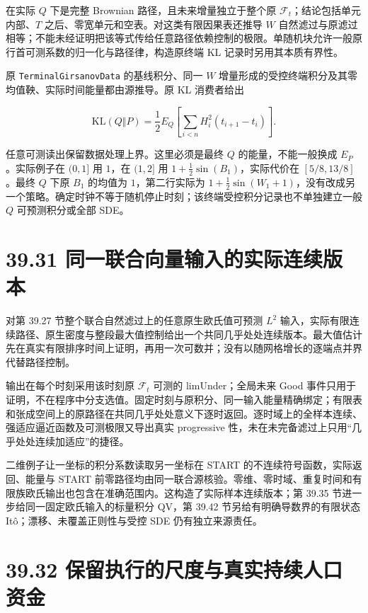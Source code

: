 \documentclass[
  11pt,
  oneside]{book}
\begin{document}
在实际 \(Q\) 下是完整 Brownian 路径，且未来增量独立于整个原 \(\mathcal F_t\)；结论包括单元内部、\(T\) 之后、零宽单元和空表。对这类有限因果表还推导 \(W\) 自然滤过与原滤过相等；不能未经证明把该等式传给任意路径依赖控制的极限。单随机块允许一般原行首可测系数的归一化与路径律，构造原终端 KL 记录时另用其本质有界性。

原 \nolinkurl{TerminalGirsanovData} 的基线积分、同一 \(W\) 增量形成的受控终端积分及其零均值鞅、实际时间能量都由源推导。原 KL 消费者给出

\[\mathrm{KL}(Q\Vert P)=\frac12 E_Q\!\left[\sum_{i<n}H_i^2(t_{i+1}-t_i)\right].\]

任意可测读出保留数据处理上界。这里必须是最终 \(Q\) 的能量，不能一般换成 \(E_P\)。实际例子在 \((0,1]\) 用 \(1\)，在 \((1,2]\) 用 \(1+\tfrac12\sin(B_1)\)，实际代价在 \([5/8,13/8]\)。最终 \(Q\) 下原 \(B_1\) 的均值为 \(1\)，第二行实际为 \(1+\tfrac12\sin(W_1+1)\)，没有改成另一个策略。确定时钟不等于随机停止时刻；该终端受控积分记录也不单独建立一般 \(Q\) 可预测积分或全部 SDE。

\section{39.31 同一联合向量输入的实际连续版本}\label{ux540cux4e00ux8054ux5408ux5411ux91cfux8f93ux5165ux7684ux5b9eux9645ux8fdeux7eedux7248ux672c}

对第 39.27 节整个联合自然滤过上的任意原生欧氏值可预测 \(L^2\) 输入，实际有限连续路径、原生密度与整段最大值控制给出一个共同几乎处处连续版本。最大值估计先在真实有限排序时间上证明，再用一次可数并；没有以随网格增长的逐端点并界代替路径控制。

输出在每个时刻采用该时刻原 \(\mathcal F_t\) 可测的 limUnder；全局未来 Good 事件只用于证明，不在程序中分支选值。固定时刻与原积分、同一输入能量精确绑定；有限表和张成空间上的原路径在共同几乎处处意义下逐时返回。逐时域上的全样本连续、强适应逼近函数及可测极限又导出真实 progressive 性，未在未完备滤过上只用``几乎处处连续加适应''的捷径。

二维例子让一坐标的积分系数读取另一坐标在 START 的不连续符号函数，实际返回、能量与 START 前零路径均由同一联合源核验。零维、零时域、重复时间和有限族欧氏输出也包含在准确范围内。这构造了实际样本连续版本；第 39.35 节进一步给同一固定欧氏输入的标量积分 QV，第 39.42 节另给有明确导数界的有限状态 Itô；漂移、未覆盖正则性与受控 SDE 仍有独立来源责任。

\section{39.32 保留执行的尺度与真实持续人口资金}\label{ux4fddux7559ux6267ux884cux7684ux5c3aux5ea6ux4e0eux771fux5b9eux6301ux7eedux4ebaux53e3ux8d44ux91d1}
\end{document}
